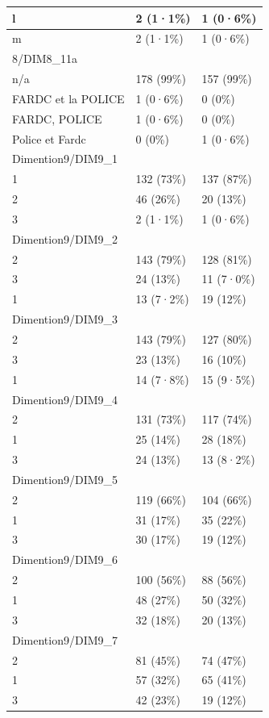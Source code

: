 \documentclass[
]{book}
\begin{document}
\begin{tabular}{l|l|l}
\hline
l & 2 (1·1\%) & 1 (0·6\%)\\
\hline
m & 2 (1·1\%) & 1 (0·6\%)\\
\hline
8/DIM8\_11a &  & \\
\hline
n/a & 178 (99\%) & 157 (99\%)\\
\hline
FARDC et la POLICE & 1 (0·6\%) & 0 (0\%)\\
\hline
FARDC, POLICE & 1 (0·6\%) & 0 (0\%)\\
\hline
Police et Fardc & 0 (0\%) & 1 (0·6\%)\\
\hline
Dimention9/DIM9\_1 &  & \\
\hline
1 & 132 (73\%) & 137 (87\%)\\
\hline
2 & 46 (26\%) & 20 (13\%)\\
\hline
3 & 2 (1·1\%) & 1 (0·6\%)\\
\hline
Dimention9/DIM9\_2 &  & \\
\hline
2 & 143 (79\%) & 128 (81\%)\\
\hline
3 & 24 (13\%) & 11 (7·0\%)\\
\hline
1 & 13 (7·2\%) & 19 (12\%)\\
\hline
Dimention9/DIM9\_3 &  & \\
\hline
2 & 143 (79\%) & 127 (80\%)\\
\hline
3 & 23 (13\%) & 16 (10\%)\\
\hline
1 & 14 (7·8\%) & 15 (9·5\%)\\
\hline
Dimention9/DIM9\_4 &  & \\
\hline
2 & 131 (73\%) & 117 (74\%)\\
\hline
1 & 25 (14\%) & 28 (18\%)\\
\hline
3 & 24 (13\%) & 13 (8·2\%)\\
\hline
Dimention9/DIM9\_5 &  & \\
\hline
2 & 119 (66\%) & 104 (66\%)\\
\hline
1 & 31 (17\%) & 35 (22\%)\\
\hline
3 & 30 (17\%) & 19 (12\%)\\
\hline
Dimention9/DIM9\_6 &  & \\
\hline
2 & 100 (56\%) & 88 (56\%)\\
\hline
1 & 48 (27\%) & 50 (32\%)\\
\hline
3 & 32 (18\%) & 20 (13\%)\\
\hline
Dimention9/DIM9\_7 &  & \\
\hline
2 & 81 (45\%) & 74 (47\%)\\
\hline
1 & 57 (32\%) & 65 (41\%)\\
\hline
3 & 42 (23\%) & 19 (12\%)\\

\end{tabular}
\end{document}
